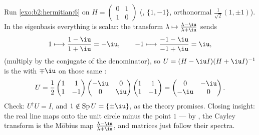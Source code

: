 \begin{example}\label{ex:b2:hermitian:cayleyrun}
Run \cref{exo:b2:hermitian:6} on $H = \begin{pmatrix} 0 & 1\\
1 & 0\end{pmatrix}$ (,  $\{1, -1\}$,
orthonormal  $\frac{1}{\sqrt2}(1, \pm1)$). In the
eigenbasis everything is scalar: the transform $\lambda
\mapsto \frac{\lambda - \iu}{\lambda + \iu}$ sends
\[
1 \longmapsto \frac{1 - \iu}{1 + \iu} = -\iu,
\qquad
-1 \longmapsto \frac{-1 - \iu}{-1 + \iu} = \iu ,
\]
(multiply by the conjugate of the denominator), so $U = (H -
\iu I)(H + \iu I)^{-1}$ is the  with 
$\mp\iu$ on those same :
\[
U = \frac{1}{2}\begin{pmatrix} 1 & 1\\ 1 & -1\end{pmatrix}
\begin{pmatrix} -\iu & 0\\ 0 & \iu\end{pmatrix}
\begin{pmatrix} 1 & 1\\ 1 & -1\end{pmatrix}
= \begin{pmatrix} 0 & -\iu\\ -\iu & 0\end{pmatrix} .
\]
Check: $U^\dagger U = I$, and $1 \notin \operatorname{Sp}U =
\{\pm\iu\}$, as the theory promises. Closing insight: the real
line maps onto the unit circle minus the point $1$ ---
 by , the Cayley transform is the
M\"obius map $\frac{\lambda-\iu}{\lambda+\iu}$, and matrices
just follow their spectra.
\end{example}

